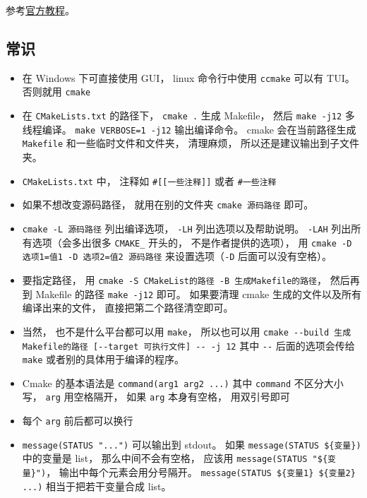 
\begin{issues}
\issueDraft
\end{issues}


参考\href{https://cmake.org/cmake/help/latest/guide/tutorial/index.html}{官方教程}。

\subsection{常识}
\begin{itemize}
\item 在 Windows 下可直接使用 GUI， linux 命令行中使用 \verb`ccmake` 可以有 TUI。 否则就用 \verb`cmake`
\item 在 \verb|CMakeLists.txt| 的路径下， \verb`cmake .` 生成 Makefile， 然后 \verb|make -j12| 多线程编译。 \verb|make VERBOSE=1 -j12| 输出编译命令。 cmake 会在当前路径生成 \verb|Makefile| 和一些临时文件和文件夹， 清理麻烦， 所以还是建议输出到子文件夹。
\item \verb|CMakeLists.txt| 中， 注释如 \verb|#[[一些注释]]| 或者 \verb|#一些注释|
\item 如果不想改变源码路径， 就用在别的文件夹 \verb|cmake 源码路径| 即可。
\item \verb|cmake -L 源码路径| 列出编译选项， \verb|-LH| 列出选项以及帮助说明。 \verb|-LAH| 列出所有选项（会多出很多 \verb|CMAKE_| 开头的， 不是作者提供的选项）， 用 \verb|cmake -D 选项1=值1 -D 选项2=值2 源码路径| 来设置选项（\verb|-D| 后面可以没有空格）。
\item 要指定路径， 用 \verb|cmake -S CMakeList的路径 -B 生成Makefile的路径|， 然后再到 Makefile 的路径 \verb|make -j12| 即可。 如果要清理 cmake 生成的文件以及所有编译出来的文件， 直接把第二个路径清空即可。
\item 当然， 也不是什么平台都可以用 \verb|make|， 所以也可以用 \verb|cmake --build 生成Makefile的路径 [--target 可执行文件] -- -j 12| 其中 \verb|--| 后面的选项会传给 \verb|make| 或者别的具体用于编译的程序。
\item Cmake 的基本语法是 \verb`command(arg1 arg2 ...)` 其中 \verb|command| 不区分大小写， \verb`arg` 用空格隔开， 如果 \verb|arg| 本身有空格， 用双引号即可
\item 每个 \verb`arg` 前后都可以换行
\item \verb`message(STATUS "...")` 可以输出到 stdout。 如果 \verb`message(STATUS ${变量})` 中的变量是 list， 那么中间不会有空格， 应该用 \verb`message(STATUS "${变量}")`， 输出中每个元素会用分号隔开。 \verb`message(STATUS ${变量1} ${变量2} ...)` 相当于把若干变量合成 list。

\end{itemize}
